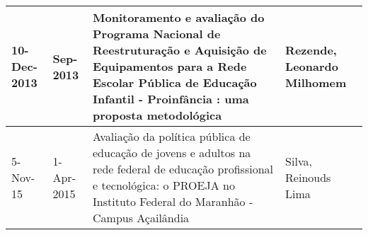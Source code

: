 \begin{table}
{\begin{tabular}{|m{1.3cm}|m{1.3cm}|p{7cm}|p{6cm}|}
10-Dec-2013 & Sep-2013    & Monitoramento e avaliação do Programa Nacional de Reestruturação e Aquisição de Equipamentos para a Rede Escolar Pública de Educação Infantil - Proinfância : uma proposta metodológica                               & Rezende, Leonardo Milhomem                                                                                                                                                                                                                                   \\ \hline
5-Nov-15    & 1-Apr-2015  & Avaliação da política pública de educação de jovens e adultos na rede federal de educação profissional e tecnológica: o PROEJA no Instituto Federal do Maranhão - Campus Açailândia                                   & Silva, Reinouds Lima                                                                                                                                                                                                                                         \\ \hline
\end{tabular}}
\end{table}





